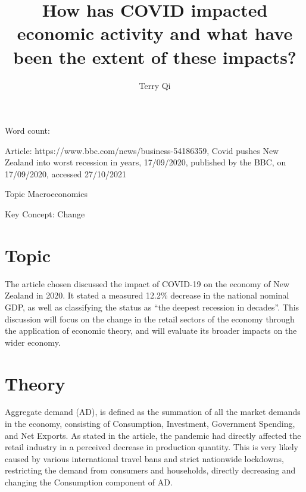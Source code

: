 \documentclass[a4paper,12pt]{article}
\title{How has COVID impacted economic activity and what have been the extent of these impacts?}
\author{Terry Qi}
\begin{document}
\maketitle
\newpage
Word count:

Article: https://www.bbc.com/news/business-54186359, Covid pushes New Zealand into worst recession in years, 17/09/2020, published by the BBC, on 17/09/2020, accessed 27/10/2021

Topic Macroeconomics

Key Concept: Change

















\section*{Topic}
The article chosen discussed the impact of COVID-19 on the economy of New Zealand in 2020. It stated a measured 12.2\% decrease in the national nominal GDP, as well as classifying the status as ``the deepest recession in decades''. This discussion will focus on the change in the retail sectors of the economy through the application of economic theory, and will evaluate its broader impacts on the wider economy.

\section*{Theory}
Aggregate demand (AD), is defined as the summation of all the market demands in the economy, consisting of Consumption, Investment, Government Spending, and Net Exports. As stated in the article, the pandemic had directly affected the retail industry in a perceived decrease in production quantity. This is very likely caused by various international travel bans and strict nationwide lockdowns, restricting the demand from consumers and households, directly decreasing and changing the Consumption component of AD.
\end{document}
